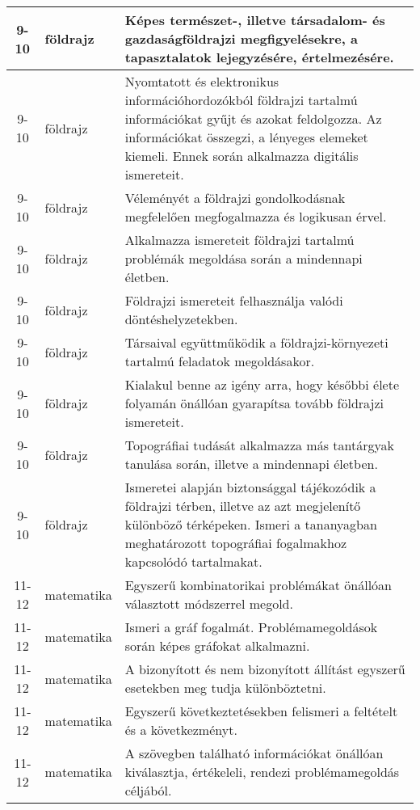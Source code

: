 \begin{small}
\begin{longtable}{c | p{2cm} |  p{11cm} }
              9-10 & földrajz & Képes természet-, illetve társadalom- és gazdaságföldrajzi megfigyelésekre, a tapasztalatok lejegyzésére, értelmezésére. \\ \hline
              9-10 & földrajz & Nyomtatott és elektronikus információhordozókból földrajzi tartalmú információkat gyűjt és azokat feldolgozza. Az információkat összegzi, a lényeges elemeket kiemeli. Ennek során alkalmazza digitális ismereteit. \\ \hline
              9-10 & földrajz & Véleményét a földrajzi gondolkodásnak megfelelően megfogalmazza és logikusan érvel. \\ \hline
              9-10 & földrajz & Alkalmazza ismereteit földrajzi tartalmú problémák megoldása során a mindennapi életben. \\ \hline
              9-10 & földrajz & Földrajzi ismereteit felhasználja valódi döntéshelyzetekben. \\ \hline
              9-10 & földrajz & Társaival együttműködik a földrajzi-környezeti tartalmú feladatok megoldásakor. \\ \hline
              9-10 & földrajz & Kialakul benne az igény arra, hogy későbbi élete folyamán önállóan gyarapítsa tovább földrajzi ismereteit. \\ \hline
              9-10 & földrajz & Topográfiai tudását alkalmazza más tantárgyak tanulása során, illetve a mindennapi életben. \\ \hline
              9-10 & földrajz & Ismeretei alapján biztonsággal tájékozódik a földrajzi térben, illetve az azt megjelenítő különböző térképeken. Ismeri a tananyagban meghatározott topográfiai fogalmakhoz kapcsolódó tartalmakat. \\ \hline
              11-12 & matematika & Egyszerű kombinatorikai problémákat önállóan választott módszerrel megold. \\ \hline
              11-12 & matematika & Ismeri a gráf fogalmát. Problémamegoldások során képes gráfokat alkalmazni. \\ \hline
              11-12 & matematika & A bizonyított és nem bizonyított állítást egyszerű esetekben meg tudja különböztetni. \\ \hline
              11-12 & matematika & Egyszerű következtetésekben felismeri a feltételt és a következményt. \\ \hline
              11-12 & matematika & A szövegben található információkat önállóan kiválasztja, értékeleli, rendezi problémamegoldás céljából. \\ \hline

\end{longtable}
\end{small}

